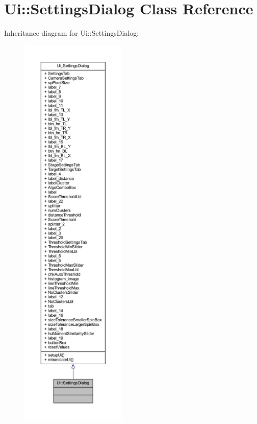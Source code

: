\hypertarget{class_ui_1_1_settings_dialog}{}\section{Ui\+:\+:Settings\+Dialog Class Reference}
\label{class_ui_1_1_settings_dialog}


Inheritance diagram for Ui\+:\+:Settings\+Dialog\+:
\nopagebreak
\begin{figure}[H]
\begin{center}
\leavevmode
\includegraphics[height=550pt]{class_ui_1_1_settings_dialog__inherit__graph}
\end{center}
\end{figure}


